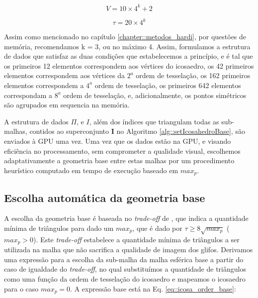 \documentclass[
    12pt,                %
    oneside,            %
    a4paper,            %
    english,            %
    french,                %
    spanish,            %
    brazil                %
    ]{abntex2}
\begin{document}
\begin{equation}
\label{eq::2ordem_icosphere_vertices}
V = 10\times 4^k + 2
\end{equation}

\begin{equation}
\label{eq::2ordem_icosphere_triangulos}
\tau = 20\times 4^k
\end{equation}

Assim como mencionado no capítulo \ref{chapter::metodos_hardi}, por questões de memória, recomendamos k = 3, ou no máximo 4. Assim, formulamos a estrutura de dados que satisfaz as duas condições que estabelecemos a princípio, e é tal que os primeiros 12 elementos correspondem aos vértices do icosaedro, os 42 primeiros elementos correspondem aos vértices da $2^a$ ordem de tesselação, os 162 primeiros elementos correspondem a $4^a$ ordem de tesselação, os primeiros 642 elementos correspondam a $8^{a}$ ordem de tesselação, e, adicionalmente, os pontos simétricos são agrupados em sequencia na memória.

A estrutura de dados $\Pi$, e $I$, além dos índices que triangulam todas as sub-malhas, contidos ao superconjunto $\mathbf{I}$ no Algoritmo \ref{alg::setIcosahedroBase}, são enviados à GPU uma vez. Uma vez que os dados estão na GPU, e visando eficiência no processamento, sem comprometer a qualidade visual, escolhemos adaptativamente a geometria base entre estas malhas por um procedimento heurístico computado em tempo de execução baseado em $max_p$.

\subsection{Escolha automática da geometria base}
\label{sssec::escolha_automatica_da_geometria_base}

A escolha da geometria base é baseada no \textit{trade-off} de , que indica a quantidade mínima de triângulos para dado um $max_p$, que é dado por $\tau \geq 8\sqrt{max_p}$  ($max_p > 0$). Este \textit{trade-off} estabelece a quantidade mínima de triângulos a ser utilizada na malha que não sacrifica a qualidade de imagem dos glifos. Derivamos uma expressão para a escolha da sub-malha da malha esférica base a partir do caso de igualdade do \textit{trade-off}, no qual substituímos a quantidade de triângulos como uma função da ordem de tesselação do icosaedro e mapeamos o icosaedro para o caso $max_p = 0$. A expressão base está na Eq. \ref{eq::icosa_order_base}:
\end{document}
